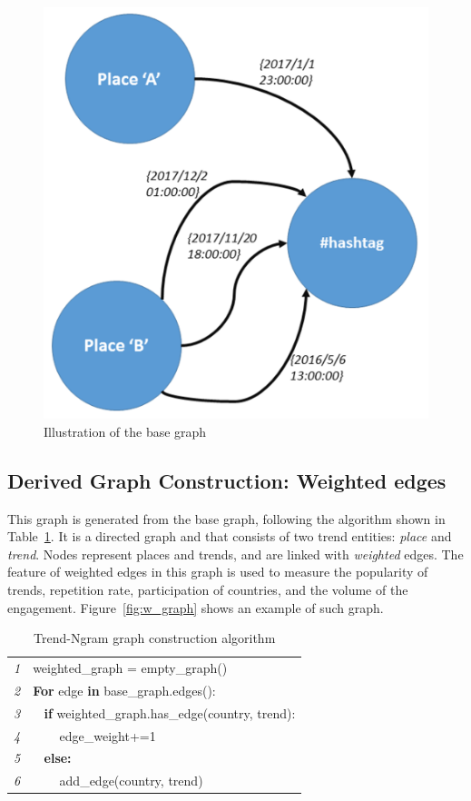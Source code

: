 \documentclass[conference]{IEEEtran}
\begin{document}
\begin{figure}[htb] \centering
\includegraphics[width=\columnwidth]{images/base_graph.png}
\caption{Illustration of the base graph}
\label{fig:basegraph}
\end{figure}


\subsection{Derived Graph Construction: Weighted edges}

This graph is generated from the base graph, following the algorithm 
shown in Table~\ref{tbl:algorithm1}. It is a directed graph and that consists of two trend entities:
{\emph{place}} and {\emph{trend}}. Nodes represent places and
trends, and are linked with {\emph{weighted}} edges. The feature 
of weighted edges in this graph is used to measure the popularity 
of trends, repetition rate, participation of countries, and the volume 
of the engagement. Figure~\ref{fig:w_graph} shows an example 
of such graph.


\begin{table}
\centering
\begin{tabular}{l|l}
\hline
{\emph{1}} & weighted\_graph = empty\_graph()\\
{\emph{2}} & \textbf{For} edge \textbf{in} base\_graph.edges():\\
{\emph{3}} &  $\>\>\>\>$\textbf{if} weighted\_graph.has\_edge(country, trend):\\
{\emph{4}} &  $\>\>\>\>\>\>\>\>$ edge\_weight+=1\\
{\emph{5}} &  $\>\>\>\>$\textbf{else:}\\
{\emph{6}} &  $\>\>\>\>\>\>\>\>$ add\_edge(country, trend)\\
\hline
\end{tabular}
\caption{Trend-Ngram graph construction algorithm}
\label{tbl:algorithm1}
\end{table}
\end{document}
